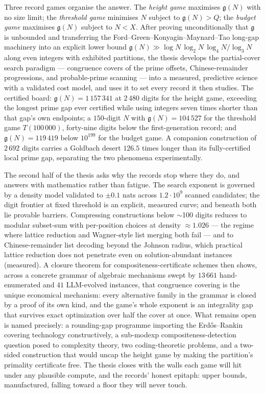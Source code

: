 \documentclass[11pt,oneside]{report}
\theoremstyle{plain}
\theoremstyle{definition}
\theoremstyle{remark}
\newcommand{\N}{N}
\newcommand{\g}{\mathfrak{g}}
\begin{document}
Three record games organise the answer. The \emph{height game} maximises
$\g(\N)$ with no size limit; the \emph{threshold game} minimises $\N$
subject to $\g(\N)>Q$; the \emph{budget game} maximises $\g(\N)$ subject
to $\N<X$. After proving unconditionally that $\g$ is unbounded and
transferring the Ford--Green--Konyagin--Maynard--Tao long-gap machinery
into an explicit lower bound
$\g(\N)\gg\log\N\,\log_2\N\,\log_4\N/\log_3\N$ along even integers with
exhibited partitions, the thesis develops the partial-cover search
paradigm --- congruence covers of the prime offsets, Chinese-remainder
progressions, and probable-prime scanning --- into a measured, predictive
science with a validated cost model, and uses it to set every record it
then studies. The certified board: $\g(\N)=1\,157\,341$ at $2\,480$
digits for the height game, exceeding the longest prime gap ever
certified while using integers seven times shorter than that gap's own
endpoints; a $150$-digit $\N$ with $\g(\N)=104\,527$ for the threshold
game $T(100\,000)$, forty-nine digits below the first-generation record;
and $\g(\N)=119\,419$ below $10^{199}$ for the budget game. A companion
construction of $2\,692$ digits carries a Goldbach desert $126.5$ times
longer than its fully-certified local prime gap, separating the two
phenomena experimentally.

The second half of the thesis asks why the records stop where they do,
and answers with mathematics rather than fatigue. The search exponent is
governed by a density model validated to $\pm0.1$ nats across
$1.2\cdot10^9$ scanned candidates; the digit frontier at fixed threshold
is an explicit, measured curve; and beneath both lie provable barriers.
Compressing constructions below $\sim$100 digits reduces to modular
subset-sum with per-position choices at density $\approx1.026$ ---
the regime where lattice reduction and Wagner-style list merging both
fail --- and to Chinese-remainder list decoding beyond the Johnson
radius, which practical lattice reduction does not penetrate even on
solution-abundant instances (measured). A closure theorem for
compositeness-certificate schemes then shows, across a concrete grammar
of algebraic mechanisms swept by $13\,661$ hand-enumerated and $41$
LLM-evolved instances, that congruence covering is the unique
economical mechanism: every alternative family in the grammar is closed
by a proof of its own kind, and the game's whole exponent is an
integrality gap that survives exact optimization over half the cover at
once. What remains open is named precisely: a rounding-gap programme
importing the Erd\H{o}s--Rankin covering technology constructively, a
sub-modexp compositeness-detection question posed to complexity theory,
two coding-theoretic problems, and a two-sided construction that would
uncap the height game by making the partition's primality certificate
free. The thesis closes with the walls each game will hit under any
plausible compute, and the records' honest epitaph: upper bounds,
manufactured, falling toward a floor they will never touch.
\end{document}
